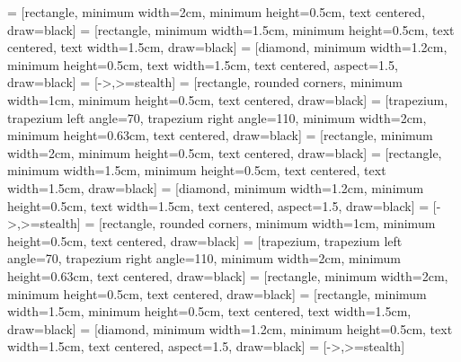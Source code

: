      = [rectangle, minimum width=2cm,   minimum height=0.5cm, text centered, draw=black]
   = [rectangle, minimum width=1.5cm, minimum height=0.5cm, text centered, text width=1.5cm, draw=black]
    = [diamond, minimum width=1.2cm, minimum height=0.5cm, text width=1.5cm, text centered, aspect=1.5, draw=black]
       = [->,>=stealth]
\fi
\if@isNIPS
   = [rectangle, rounded corners, minimum width=1cm, minimum height=0.5cm, text centered, draw=black]
          = [trapezium, trapezium left angle=70, trapezium right angle=110, minimum width=2cm, minimum height=0.63cm, text centered, draw=black]
     = [rectangle, minimum width=2cm,   minimum height=0.5cm, text centered, draw=black]
   = [rectangle, minimum width=1.5cm, minimum height=0.5cm, text centered, text width=1.5cm, draw=black]
    = [diamond, minimum width=1.2cm, minimum height=0.5cm, text width=1.5cm, text centered, aspect=1.5, draw=black]
       = [->,>=stealth]
\fi
\if@isAAAI
   = [rectangle, rounded corners, minimum width=1cm, minimum height=0.5cm, text centered, draw=black]
          = [trapezium, trapezium left angle=70, trapezium right angle=110, minimum width=2cm, minimum height=0.63cm, text centered, draw=black]
     = [rectangle, minimum width=2cm,   minimum height=0.5cm, text centered, draw=black]
   = [rectangle, minimum width=1.5cm, minimum height=0.5cm, text centered, text width=1.5cm, draw=black]
    = [diamond, minimum width=1.2cm, minimum height=0.5cm, text width=1.5cm, text centered, aspect=1.5, draw=black]
       = [->,>=stealth]
\fi
\makeatother

\makeatletter
\if@isIEEE
  \renewcommand\paragraph[1]{{\vspace{1mm}\noindent\bfseries #1 }}
\fi
\makeatother

\makeatletter
\if@isACM
  \usepackage{fontawesome5}
\fi
\makeatother

\makeatletter
\if@isAAAI\else
  \usepackage{listings}
  \lstset{
    language=Python,
    stepnumber=1,
    numbersep=5pt,
    tabsize=4,
    basicstyle=\scriptsize\ttfamily,
    columns=fullflexible,
    keepspaces,
    showstringspaces=false
  }
\fi
\makeatother

